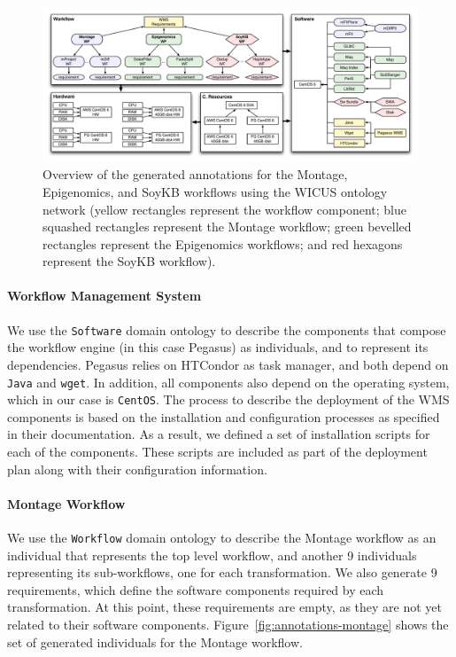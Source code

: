 \begin{figure}[!htb]
	\centering
	\includegraphics[width=\linewidth]{figures/annotations}
	\vspace{-20pt}
	\caption{Overview of the generated annotations for the Montage, Epigenomics, and 
  	  SoyKB workflows using the WICUS ontology network (yellow rectangles represent the 
	  workflow component; blue squashed rectangles represent the Montage workflow; green 
	  bevelled rectangles represent the Epigenomics workflows; and red hexagons represent 
	  the SoyKB workflow).}
	\label{fig:annotations}
\end{figure}


\paragraph{\textbf{Workflow Management System}}
We use the \texttt{Software} domain ontology to describe the components that
compose the workflow engine (in this case Pegasus) as individuals, and to 
represent its dependencies. Pegasus relies on HTCondor as task manager, and 
both depend on \texttt{Java} and \texttt{wget}. In addition, all components also
depend on the operating system, which in our case is \texttt{CentOS}. The process
to describe the deployment of the WMS components is based on the installation 
and configuration processes as specified in their documentation. As a result, we 
defined a set of installation scripts for each of the components. These scripts are 
included as part of the deployment plan along with their configuration information.


\paragraph{\textbf{Montage Workflow}}
We use the \texttt{Workflow} domain ontology to describe the Montage workflow 
as an individual that represents the top level workflow, and another 9 individuals 
representing its sub-workflows, one for each transformation. We also generate 9 
requirements, which define the software components required by each transformation. 
At this point, these requirements are empty, as they are not yet related to their software 
components. Figure~\ref{fig:annotations-montage} shows the set of generated individuals
for the Montage workflow.

